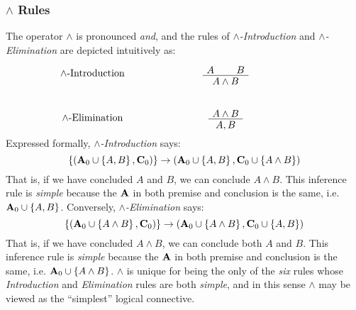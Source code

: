 \documentclass[11pt]{article}
\begin{document}
\subsubsection*{$\land$ Rules}
The operator $\land$ is pronounced {\em and}, and the rules of {\em $\land$-Introduction} and {\em $\land$-Elimination} are depicted intuitively as:
\begin{equation}
    \begin{tabular}{c c}
        $\land$-Introduction &  
    \begin{minipage}{.5\textwidth}
        \begin{prooftree}
            \AxiomC{$A$}
            \AxiomC{$B$}
            \BinaryInfC{$A \land B$}
        \end{prooftree}
    \end{minipage}
        \\
        \vspace{10pt}
        \\
        $\land$-Elimination &
    \begin{minipage}{.5\textwidth}
        \begin{prooftree}
            \AxiomC{$A \land B$}
            \UnaryInfC{$A, B$}
        \end{prooftree}
    \end{minipage}
    \end{tabular}
\end{equation}
Expressed formally, {\em $\wedge$-Introduction} says:
\begin{equation}
    \left\{\left({\bf A}_0 \cup \left\{A, B\right\}, {\bf C}_0\right)\right\} \rightarrow \left({\bf A}_0 \cup \left\{A, B\right\}, {\bf C}_0 \cup \left\{A \wedge B\right\}\right)
\end{equation}
That is, if we have concluded $A$ and $B$, we can conclude $A \wedge B$.
This inference rule is {\em simple} because the ${\bf A}$ in both premise and conclusion is the same, i.e. ${\bf A}_0 \cup \left\{A, B\right\}$.
Conversely, {\em $\wedge$-Elimination} says:
\begin{equation}
    \left\{\left({\bf A}_0 \cup \left\{A \wedge B\right\}, {\bf C}_0\right)\right\} \rightarrow \left({\bf A}_0 \cup \left\{A \wedge B\right\}, {\bf C}_0 \cup \left\{A, B\right\}\right)
\end{equation}
That is, if we have concluded $A \wedge B$, we can conclude both $A$ and $B$.
This inference rule is {\em simple} because the ${\bf A}$ in both premise and conclusion is the same, i.e. ${\bf A}_0 \cup \left\{A \wedge B\right\}$.
$\land$ is unique for being the only of the {\em six} rules whose {\em Introduction} and {\em Elimination} rules are both {\em simple}, and in this sense $\land$ may be viewed as the ``simplest'' logical connective.
\end{document}
